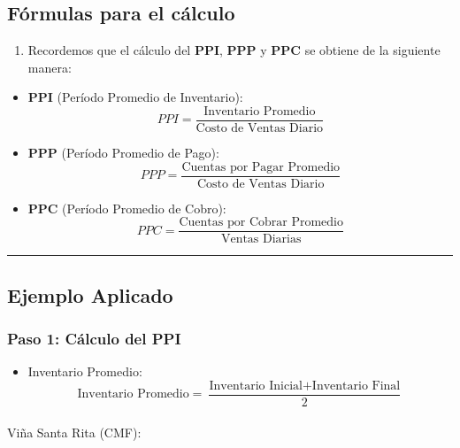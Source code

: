 \documentclass[
  letterpaper,
  DIV=11,
  numbers=noendperiod]{scrartcl}
\makeatletter
\let\oldparagraph\paragraph
\renewcommand{\paragraph}{
    \@ifstar
      \xxxParagraphStar
      \xxxParagraphNoStar
  }
\newcommand{\xxxParagraphStar}[1]{\oldparagraph*{#1}\mbox{}}
\newcommand{\xxxParagraphNoStar}[1]{\oldparagraph{#1}\mbox{}}
\providecommand{\tightlist}{%
  \setlength{\itemsep}{0pt}\setlength{\parskip}{0pt}}\usepackage{longtable,booktabs,array}
\makeatother
\begin{document}
\subsection{Fórmulas para el
cálculo}\label{fuxf3rmulas-para-el-cuxe1lculo}

\begin{enumerate}
\def\labelenumi{\arabic{enumi}.}
\setcounter{enumi}{1}
\tightlist
\item
  Recordemos que el cálculo del \textbf{PPI}, \textbf{PPP} y
  \textbf{PPC} se obtiene de la siguiente manera:
\end{enumerate}

\begin{itemize}
\item
  \textbf{PPI} (Período Promedio de Inventario): \[ 
  PPI = \frac{\text{Inventario Promedio}}{\text{Costo de Ventas Diario}} 
  \]
\item
  \textbf{PPP} (Período Promedio de Pago): \[
  PPP = \frac{\text{Cuentas por Pagar Promedio}}{\text{Costo de Ventas Diario}} 
  \]
\item
  \textbf{PPC} (Período Promedio de Cobro): \[ 
  PPC = \frac{\text{Cuentas por Cobrar Promedio}}{\text{Ventas Diarias}} 
  \]
\end{itemize}

\begin{center}\rule{0.5\linewidth}{0.5pt}\end{center}

\subsection{Ejemplo Aplicado}\label{ejemplo-aplicado}

\subsubsection{Paso 1: Cálculo del PPI}\label{paso-1-cuxe1lculo-del-ppi}

\begin{itemize}
\tightlist
\item
  Inventario Promedio: \[
  \text{Inventario Promedio} = \frac{\text{Inventario Inicial} + \text{Inventario Final}}{2}
  \]
\end{itemize}

\paragraph{Viña Santa Rita (CMF):}\label{viuxf1a-santa-rita-cmf}
\end{document}
